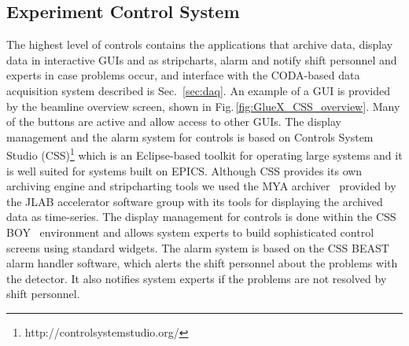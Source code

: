 \subsection{Experiment Control System \label{sec:alarms}}
The highest level of controls contains the applications that archive data, display data in interactive GUIs and as stripcharts, alarm and notify shift personnel and experts in case problems occur, and interface with the CODA-based data acquisition system described is Sec.~\ref{sec:daq}.
An example of a GUI is provided by the beamline overview screen, shown in Fig.\,\ref{fig:GlueX_CSS_overview}. Many of the buttons are active and allow access to other GUIs.
The display management and the alarm system for \gx{} controls is based on Controls System Studio (CSS)\footnote{http://controlsystemstudio.org/}  which is an Eclipse-based toolkit for operating large systems and it is well suited for systems built on EPICS. Although CSS provides its own archiving engine and stripcharting tools we used the MYA archiver~\cite{Slominski:2009icaleps} provided by the JLAB accelerator software group with its tools for displaying the archived data as time-series. The display management for \gx{} controls is done within the CSS BOY~\cite{Chen:2011icaleps} environment and allows system experts to build sophisticated control screens using standard widgets. The alarm system is based on the CSS BEAST\cite{Kasemir:2009icaleps} alarm handler software, which alerts the shift personnel about the problems with the detector. It also notifies system experts if the problems are not resolved by shift personnel. 